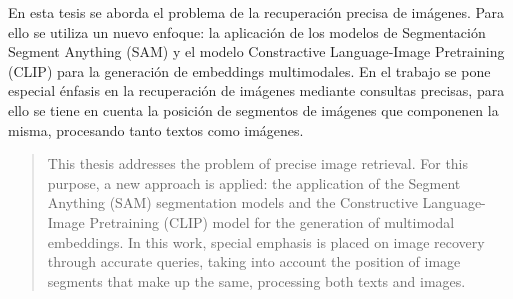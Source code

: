 \begin{resumen}
	En esta tesis se aborda el problema de la recuperación precisa de imágenes. Para ello se utiliza un nuevo enfoque: la aplicación de los modelos de Segmentación Segment Anything (SAM) y el  modelo Constractive Language-Image Pretraining (CLIP) para la generación de embeddings multimodales. En el trabajo se pone especial énfasis en la recuperación de  imágenes mediante consultas precisas, para ello se tiene en cuenta la posición de segmentos de imágenes que componenen la misma, procesando tanto textos como imágenes.
	\end{resumen}
	
	\begin{abstract}
		This thesis addresses the problem of precise image retrieval. For this purpose, a new approach is applied: the application of the Segment Anything (SAM) segmentation models and the Constructive Language-Image Pretraining (CLIP) model for the generation of multimodal embeddings. In this work, special emphasis is placed on image recovery through accurate queries, taking into account the position of image segments that make up the same, processing both texts and images.
	\end{abstract}